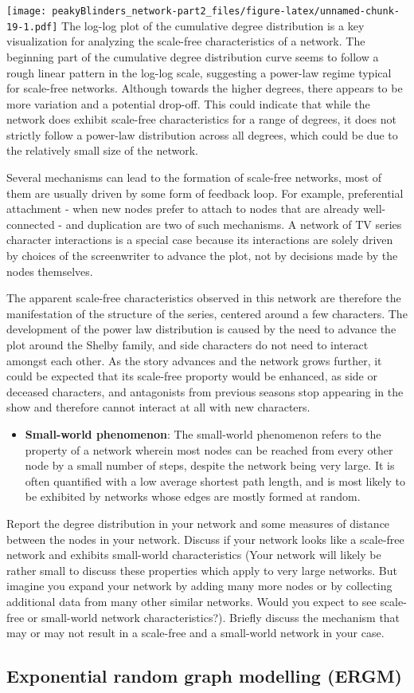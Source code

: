 \documentclass[
]{article}
\providecommand{\tightlist}{%
  \setlength{\itemsep}{0pt}\setlength{\parskip}{0pt}}
\begin{document}
\texttt{[image: peakyBlinders\_network-part2\_files/figure-latex/unnamed-chunk-19-1.pdf]}
The log-log plot of the cumulative degree distribution is a key
visualization for analyzing the scale-free characteristics of a network.
The beginning part of the cumulative degree distribution curve seems to
follow a rough linear pattern in the log-log scale, suggesting a
power-law regime typical for scale-free networks. Although towards the
higher degrees, there appears to be more variation and a potential
drop-off. This could indicate that while the network does exhibit
scale-free characteristics for a range of degrees, it does not strictly
follow a power-law distribution across all degrees, which could be due
to the relatively small size of the network.

Several mechanisms can lead to the formation of scale-free networks,
most of them are usually driven by some form of feedback loop. For
example, preferential attachment - when new nodes prefer to attach to
nodes that are already well-connected - and duplication are two of such
mechanisms. A network of TV series character interactions is a special
case because its interactions are solely driven by choices of the
screenwriter to advance the plot, not by decisions made by the nodes
themselves.

The apparent scale-free characteristics observed in this network are
therefore the manifestation of the structure of the series, centered
around a few characters. The development of the power law distribution
is caused by the need to advance the plot around the Shelby family, and
side characters do not need to interact amongst each other. As the story
advances and the network grows further, it could be expected that its
scale-free proporty would be enhanced, as side or deceased characters,
and antagonists from previous seasons stop appearing in the show and
therefore cannot interact at all with new characters.

\begin{itemize}
\tightlist
\item
  \textbf{Small-world phenomenon}: The small-world phenomenon refers to
  the property of a network wherein most nodes can be reached from every
  other node by a small number of steps, despite the network being very
  large. It is often quantified with a low average shortest path length,
  and is most likely to be exhibited by networks whose edges are mostly
  formed at random.
\end{itemize}

Report the degree distribution in your network and some measures of
distance between the nodes in your network. Discuss if your network
looks like a scale-free network and exhibits small-world characteristics
(Your network will likely be rather small to discuss these properties
which apply to very large networks. But imagine you expand your network
by adding many more nodes or by collecting additional data from many
other similar networks. Would you expect to see scale- free or
small-world network characteristics?). Briefly discuss the mechanism
that may or may not result in a scale-free and a small-world network in
your case.

\hypertarget{exponential-random-graph-modelling-ergm}{%
\subsection{Exponential random graph modelling
(ERGM)}\label{exponential-random-graph-modelling-ergm}}
\end{document}
